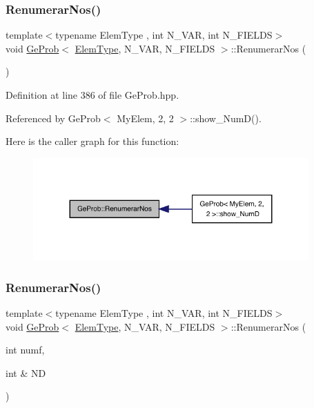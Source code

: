 \subsubsection{\texorpdfstring{Renumerar\+Nos()}{RenumerarNos()}\hspace{0.1cm}{\footnotesize\ttfamily [1/2]}}
{\footnotesize\ttfamily template$<$typename Elem\+Type , int N\+\_\+\+V\+AR, int N\+\_\+\+F\+I\+E\+L\+DS$>$ \\
void \hyperlink{classGeProb}{Ge\+Prob}$<$ \hyperlink{spectral_8h_aaa2c1a7b2d1b12c590d730fe6ac839fa}{Elem\+Type}, N\+\_\+\+V\+AR, N\+\_\+\+F\+I\+E\+L\+DS $>$\+::Renumerar\+Nos (\begin{DoxyParamCaption}{ }\end{DoxyParamCaption})}



Definition at line 386 of file Ge\+Prob.\+hpp.



Referenced by Ge\+Prob$<$ My\+Elem, 2, 2 $>$\+::show\+\_\+\+Num\+D().

Here is the caller graph for this function\+:
\nopagebreak
\begin{figure}[H]
\begin{center}
\leavevmode
\includegraphics[width=299pt]{classGeProb_a18cfc81b7accb83b55b9e69d2738c5de_icgraph}
\end{center}
\end{figure}
\mbox{\label{classGeProb_aa656597aedeff1096736c98b1f51c55f}} 
\subsubsection{\texorpdfstring{Renumerar\+Nos()}{RenumerarNos()}\hspace{0.1cm}{\footnotesize\ttfamily [2/2]}}
{\footnotesize\ttfamily template$<$typename Elem\+Type , int N\+\_\+\+V\+AR, int N\+\_\+\+F\+I\+E\+L\+DS$>$ \\
void \hyperlink{classGeProb}{Ge\+Prob}$<$ \hyperlink{spectral_8h_aaa2c1a7b2d1b12c590d730fe6ac839fa}{Elem\+Type}, N\+\_\+\+V\+AR, N\+\_\+\+F\+I\+E\+L\+DS $>$\+::Renumerar\+Nos (\begin{DoxyParamCaption}\item[{int}]{numf,  }\item[{int \&}]{ND }\end{DoxyParamCaption})}



